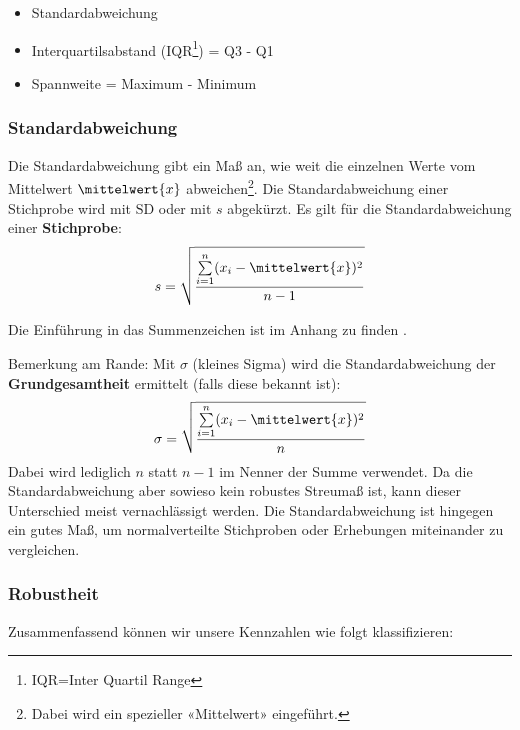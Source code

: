 \begin{itemize}
\item Standardabweichung

\item Interquartilsabstand (IQR\footnote{IQR=Inter Quartil
    Range}) = Q3 - Q1

\item Spannweite = Maximum - Minimum

\end{itemize}

\subsubsection{Standardabweichung}
Die Standardabweichung gibt ein Maß an, wie weit die einzelnen Werte
vom Mittelwert $\mittelwert{x}$ abweichen\footnote{Dabei wird ein spezieller «Mittelwert»
  eingeführt.}.
Die Standardabweichung einer Stichprobe wird mit $\textrm{SD}$ oder
mit $s$ abgekürzt. Es gilt für die Standardabweichung einer
\textbf{Stichprobe}:
$$s = \sqrt{\frac{\sum\limits_{i=1}^n(x_i-\mittelwert{x})^2}{n-1}}$$

Die Einführung in das Summenzeichen ist im Anhang zu finden .

Bemerkung am Rande: Mit $\sigma$ (kleines Sigma) wird die
Standardabweichung der \textbf{Grundgesamtheit} ermittelt (falls diese
bekannt ist):
$$\sigma = \sqrt{\frac{\sum\limits_{i=1}^n(x_i-\mittelwert{x})^2}{n}}$$
Dabei wird lediglich $n$ statt $n-1$ im Nenner der Summe verwendet. Da
die Standardabweichung aber sowieso kein robustes Streumaß ist, kann
dieser Unterschied meist vernachlässigt werden. Die Standardabweichung ist hingegen ein gutes Maß, um normalverteilte Stichproben oder Erhebungen miteinander zu vergleichen. 

\newpage
\subsubsection{Robustheit}
Zusammenfassend können wir unsere Kennzahlen wie folgt klassifizieren:

